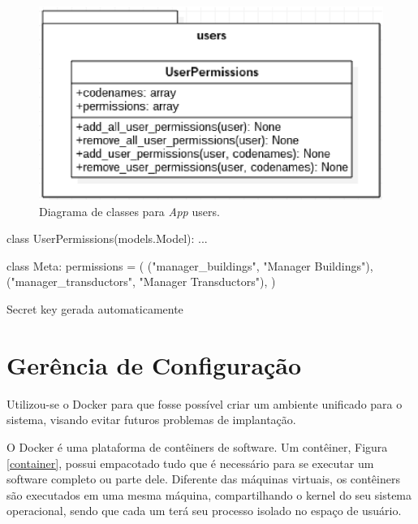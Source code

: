 \begin{figure}[!h]
    \centering
    \includegraphics[keepaspectratio=true,scale=0.8]{figuras/app_users.eps}
    \caption{Diagrama de classes para \textit{App} users.}
    \label{app_users}
\end{figure}

\begin{python}[caption={Permissões presentes na classe UserPermissions.}, captionpos=b]
class UserPermissions(models.Model):
    ...

    class Meta:
        permissions = (
            ("manager_buildings", "Manager Buildings"),
            ("manager_transductors", "Manager Transductors"),
        )
\end{python}

Secret key gerada automaticamente

\section{Gerência de Configuração}
Utilizou-se o Docker \cite{docker} para que fosse possível criar um ambiente unificado para o sistema, visando evitar futuros problemas de implantação.

O Docker é uma plataforma de contêiners de software. Um contêiner, Figura \ref{container}, possui empacotado tudo que é necessário para se executar um software completo ou parte dele. Diferente das máquinas virtuais, os contêiners são executados em uma mesma máquina, compartilhando o kernel do seu sistema operacional, sendo que cada um terá seu processo isolado no espaço de usuário.

